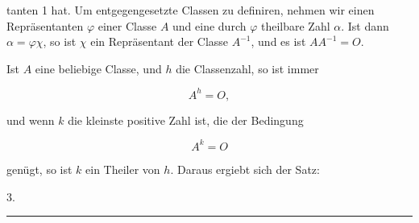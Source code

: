 tanten 1 hat. Um entgegengesetzte Classen zu definiren, nehmen wir einen Repräsentanten $\varphi$ einer Classe $A$ und eine durch $\varphi$ theilbare Zahl $\alpha$. Ist dann $\alpha = \varphi\chi$, so ist $\chi$ ein Repräsentant der Classe $A^{-1}$, und es ist $AA^{-1} = O$.

Ist $A$ eine beliebige Classe, und $h$ die Classenzahl, so ist immer

\[ A^h = O, \]

und wenn $k$ die kleinste positive Zahl ist, die der Bedingung

\[ A^k = O \]

genügt, so ist $k$ ein Theiler von $h$. Daraus ergiebt sich der Satz:

3.~

\begin{center}
\rule{4cm}{0.4pt}
\end{center}
